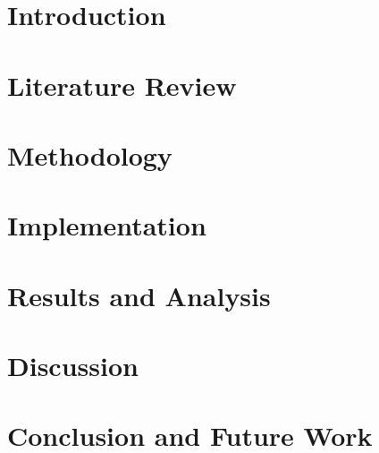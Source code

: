 \documentclass[12pt]{article}
\numberwithin{equation}{section}
\begin{document}

\clearpage

\setcounter{page}{2}


\newpage


\newpage

\newpage


\newpage


\newpage
{}
\tableofcontents

\newpage
\listoffigures

\newpage
\listoftables

\newpage
\printglossary[type=\acronymtype,title={List of Abbreviations},nonumberlist]

\newpage
\printglossary[title={List of Symbols},nonumberlist]

\newpage
{}

\section{Introduction}


\section{Literature Review}


\section{Methodology}


\section{Implementation}


\section{Results and Analysis}


\section{Discussion}


\section{Conclusion and Future Work}


\newpage


\end{document}

